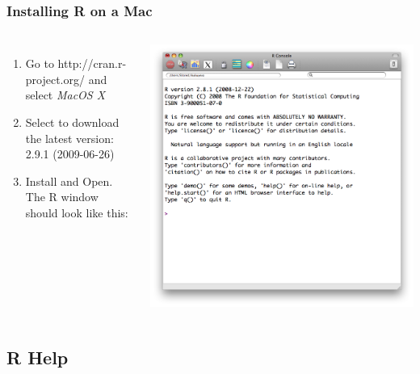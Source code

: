 \begin{frame}
\frametitle{Installing R on a Mac}

\begin{columns}
\begin{enumerate}
\item Go to \small \ttfamily http://cran.r-project.org/ \normalfont \normalsize and select \itshape MacOS X \normalfont
\item Select to download the latest version: 2.9.1 (2009-06-26)
\item Install and Open.  The R window should look like this:
\end{enumerate}
%
\begin{center}
\includegraphics[width=1\textwidth]{images/Rwindow}
\end{center}
\end{columns}

\end{frame}



\subsection{R Help}

